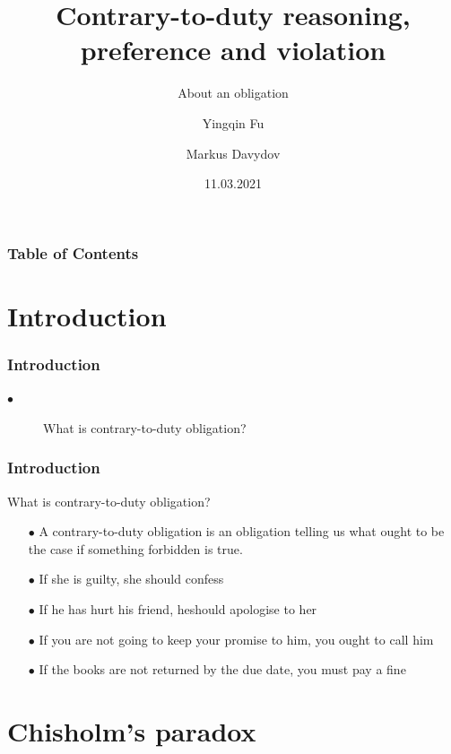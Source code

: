 \documentclass{beamer}
\title[Contrary-to-duty] %
{Contrary-to-duty reasoning, preference and violation}
\subtitle{About an obligation}
\author[Yingqin, Markus] %
{Yingqin Fu\inst{1} \and Markus Davydov\inst{2}}
\date[11.3. 2021] %
{11.03.2021}
\begin{document}
\frame{\titlepage}

\begin{frame}
\frametitle{Table of Contents}
\tableofcontents
\end{frame}
\section{Introduction}
\begin{frame}
\frametitle{Introduction}
\begin{description}
\item[$\bullet$]What is contrary-to-duty obligation?
\end{description}
\end{frame}
\begin{frame}
\frametitle{Introduction}
What is contrary-to-duty obligation?
\begin{enumerate}
\item[$\bullet$] A contrary-to-duty obligation is an obligation telling us what ought to be the case if something forbidden is true.
\end{enumerate}
\begin{examples}
\begin{enumerate}
\item[$\bullet$] If she is guilty, she should confess
\item[$\bullet$] If he has hurt his friend, heshould apologise to her
\item[$\bullet$] If you are not going to keep your promise to him, you ought to call him
\item[$\bullet$] If the books are not returned by the due date, you must pay a fine
\end{enumerate}
\end{examples}
\end{frame}

\section{Chisholm's paradox}
\end{document}
